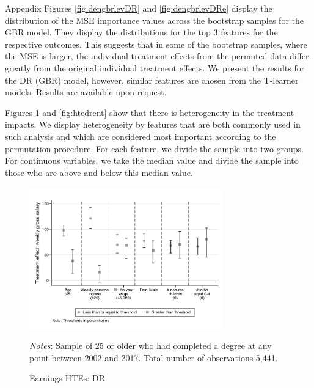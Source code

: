 \documentclass[12pt, a4paper]{article}
\begin{document}
Appendix Figures \ref{fig:dengbrlevDR} and \ref{fig:dengbrlevDRe} display the distribution of the MSE importance values across the bootstrap samples for the GBR model. They display the distributions for the
top 3 features for the respective outcomes. This suggests that in some of the bootstrap samples,
where the MSE is larger, the individual treatment effects from the permuted
data differ greatly from the original individual treatment effects. %
%
We present the results for the DR (GBR) model, however, similar features are chosen from the T-learner models. Results are available upon request. 



Figures \ref{fig:htedr} and \ref{fig:htedrent} show that there is heterogeneity in the treatment impacts. We display heterogeneity by features that are both commonly used in such analysis and which are considered most important according to the permutation procedure. For each feature, we divide the sample into two
groups. For continuous variables, we take the median value and divide the
sample into those who are above and below this median value. 

\singlespacing
\begin{figure}[htbp]
\centering
\caption{Earnings HTEs: DR}
\vspace{0.5cm}
  \label{fig:htedr}
    \includegraphics[width=0.75\textwidth]{_figures/hte_earnings_GL_100_DR.pdf}
\parbox{1\textwidth}{\footnotesize{\textit{Notes}: Sample of 25 or older who had completed a degree at any point between 2002 and 2017. Total number of observations 5,441.}}
\end{figure}
\end{document}
